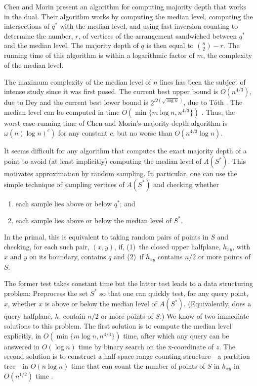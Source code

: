 \documentclass{cccg12}
\begin{document}
Chen and Morin \cite{cm11} present an algorithm for computing majority
depth that works in the dual.  Their algorithm works by computing the
median level, computing the intersections of $q^*$ with the median
level, and using fast inversion counting to determine the number, $r$,
of vertices of the arrangement sandwiched between $q^*$ and the median
level.  The majority depth of $q$ is then equal to $\binom{n}{2}-r$.
The running time of this algorithm is within a logarithmic factor of $m$,
the complexity of the median level.

The maximum complexity of the median level of $n$ lines has been the
subject of intense study since it was first posed.  The current best
upper bound is $O(n^{4/3})$, due to Dey \cite{d98} and the current best
lower bound is $2^{\Omega(\sqrt{\log n})}$, due to T\'oth \cite{t00}.
The median level can be computed in time $O(\min\{m\log n,n^{4/3}\})$
\cite{bj02,c99}.  Thus, the worst-case running time of Chen and Morin's
majority depth algorithm is $\omega(n(\log n)^c)$ for any constant $c$,
but no worse than $O(n^{4/3}\log n)$.

It seems difficult for any algorithm that computes the exact majority
depth of a point to avoid (at least implicitly) computing the median
level of $A(S^*)$.  This motivates approximation by random sampling.
In particular, one can use the simple technique of sampling vertices of
$A(S^*)$ and checking whether
\begin{enumerate}
  \item each sample lies above or below $q^*$; and
  \item each sample lies above or below the median level of $S^*$.
\end{enumerate}
In the primal, this is equivalent to taking random pairs of points in
$S$ and checking, for each such pair, $(x,y)$, if, (1)~the closed
upper halfplane, $h_{xy}$, with $x$ and $y$ on its boundary, contains $q$
and (2)~if $h_{xy}$ contains
 $n/2$ or more points of $S$.

The former test takes constant time but the latter test leads to a
data structuring problem:  Preprocess the set $S^*$ so that one can
quickly test, for any query point, $x$, whether $x$ is above or below
the median level of $A(S^*)$.  (Equivalently, does a query halfplane, $h$,
contain $n/2$ or more points of $S$.)  We know of two immediate solutions
to this problem.  The first solution is to compute the median level
explicitly, in $O(\min\{m\log n,n^{4/3}\})$ time, after which any query
can be answered in $O(\log n)$ time by binary search on the x-coordinate
of $z$.  The second solution is to construct a half-space range counting
structure---a partition tree---in $O(n\log n)$ time that can count the
number of points of $S$ in $h_{xy}$ in $O(n^{1/2})$ time \cite{c12}.
\end{document}
